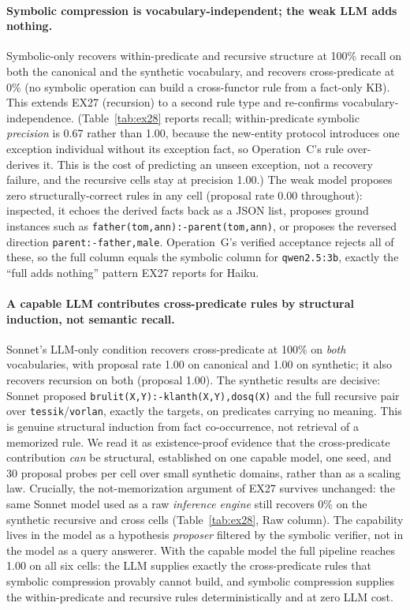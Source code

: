 \documentclass[10pt,conference]{IEEEtran}
\begin{document}
\paragraph{Symbolic compression is vocabulary-independent; the weak LLM adds nothing.}
Symbolic-only recovers within-predicate and recursive structure at 100\% recall on both the canonical and the synthetic vocabulary, and recovers cross-predicate at 0\% (no symbolic operation can build a cross-functor rule from a fact-only KB). This extends EX27 (recursion) to a second rule type and re-confirms vocabulary-independence. (Table~\ref{tab:ex28} reports recall; within-predicate symbolic \emph{precision} is 0.67 rather than 1.00, because the new-entity protocol introduces one exception individual without its exception fact, so Operation~C's rule over-derives it. This is the cost of predicting an unseen exception, not a recovery failure, and the recursive cells stay at precision 1.00.) The weak model proposes zero structurally-correct rules in any cell (proposal rate 0.00 throughout): inspected, it echoes the derived facts back as a JSON list, proposes ground instances such as \texttt{father(tom,ann):-parent(tom,ann)}, or proposes the reversed direction \texttt{parent:-father,male}. Operation~G's verified acceptance rejects all of these, so the full column equals the symbolic column for \texttt{qwen2.5:3b}, exactly the ``full adds nothing'' pattern EX27 reports for Haiku.

\paragraph{A capable LLM contributes cross-predicate rules by structural induction, not semantic recall.}
Sonnet's LLM-only condition recovers cross-predicate at 100\% on \emph{both} vocabularies, with proposal rate 1.00 on canonical and 1.00 on synthetic; it also recovers recursion on both (proposal 1.00). The synthetic results are decisive: Sonnet proposed \texttt{brulit(X,Y):-klanth(X,Y),dosq(X)} and the full recursive pair over \texttt{tessik}/\texttt{vorlan}, exactly the targets, on predicates carrying no meaning. This is genuine structural induction from fact co-occurrence, not retrieval of a memorized rule. We read it as existence-proof evidence that the cross-predicate contribution \emph{can} be structural, established on one capable model, one seed, and 30 proposal probes per cell over small synthetic domains, rather than as a scaling law. Crucially, the not-memorization argument of EX27 survives unchanged: the same Sonnet model used as a raw \emph{inference engine} still recovers 0\% on the synthetic recursive and cross cells (Table~\ref{tab:ex28}, Raw column). The capability lives in the model as a hypothesis \emph{proposer} filtered by the symbolic verifier, not in the model as a query answerer. With the capable model the full pipeline reaches 1.00 on all six cells: the LLM supplies exactly the cross-predicate rules that symbolic compression provably cannot build, and symbolic compression supplies the within-predicate and recursive rules deterministically and at zero LLM cost.
\end{document}
